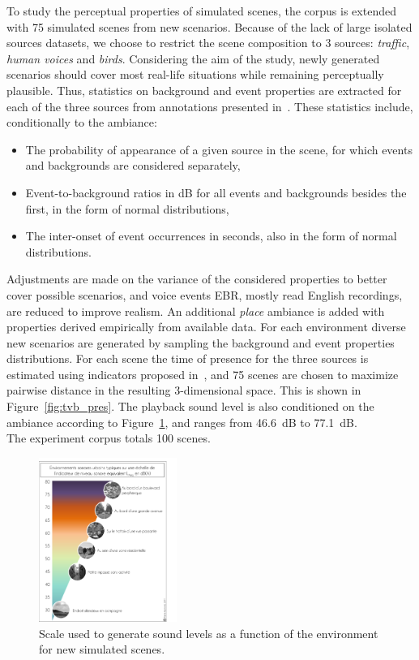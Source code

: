 \documentclass[11pt,a4paper]{article}
\begin{document}
To study the perceptual properties of simulated scenes, the corpus is extended with 75 simulated scenes from new scenarios. Because of the lack of large isolated sources datasets, we choose to restrict the scene composition to 3 sources: \textit{traffic}, \textit{human voices} and \textit{birds}. Considering the aim of the study, newly generated scenarios should cover most real-life situations while remaining perceptually plausible. Thus, statistics on background and event properties are extracted for each of the three sources from annotations presented in~\cite{gloaguen2017}. These statistics include, conditionally to the ambiance:
\begin{itemize}
\item The probability of appearance of a given source in the scene, for which events and backgrounds are considered separately,
\item Event-to-background ratios in dB for all events and backgrounds besides the first, in the form of normal distributions,
\item The inter-onset of event occurrences in seconds, also in the form of normal distributions.
\end{itemize}
Adjustments are made on the variance of the considered properties to better cover possible scenarios, and voice events EBR, mostly read English recordings, are reduced to improve realism. An additional \textit{place} ambiance is added with properties derived empirically from available data. For each environment diverse new scenarios are generated by sampling the background and event properties distributions. For each scene the time of presence for the three sources is estimated using indicators proposed in~\cite{gontier2018}, and 75 scenes are chosen to maximize pairwise distance in the resulting 3-dimensional space. This is shown in Figure~\ref{fig:tvb_pres}. The playback sound level is also conditioned on the ambiance according to Figure~\ref{fig:amb_levels}, and ranges from 46.6~dB to 77.1~dB.\\

The experiment corpus totals 100 scenes.

\begin{figure}[!h]
    \centering
    \includegraphics[width=0.4\textwidth]{figures/leqa.png}
    \caption{Scale used to generate sound levels as a function of the environment for new simulated scenes.}\label{fig:amb_levels}
\end{figure}
\end{document}
